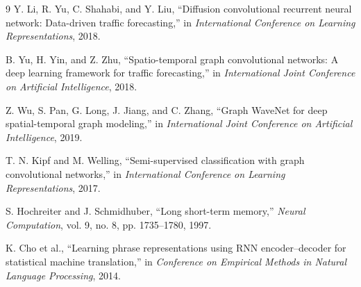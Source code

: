 \documentclass[11pt]{ctexart}
\begin{document}
\begin{thebibliography}{9}
Y. Li, R. Yu, C. Shahabi, and Y. Liu, ``Diffusion convolutional recurrent neural network: Data-driven traffic forecasting,'' in \emph{International Conference on Learning Representations}, 2018.

B. Yu, H. Yin, and Z. Zhu, ``Spatio-temporal graph convolutional networks: A deep learning framework for traffic forecasting,'' in \emph{International Joint Conference on Artificial Intelligence}, 2018.

Z. Wu, S. Pan, G. Long, J. Jiang, and C. Zhang, ``Graph WaveNet for deep spatial-temporal graph modeling,'' in \emph{International Joint Conference on Artificial Intelligence}, 2019.

T. N. Kipf and M. Welling, ``Semi-supervised classification with graph convolutional networks,'' in \emph{International Conference on Learning Representations}, 2017.

S. Hochreiter and J. Schmidhuber, ``Long short-term memory,'' \emph{Neural Computation}, vol. 9, no. 8, pp. 1735--1780, 1997.

K. Cho et al., ``Learning phrase representations using RNN encoder--decoder for statistical machine translation,'' in \emph{Conference on Empirical Methods in Natural Language Processing}, 2014.
\end{thebibliography}
\end{document}
